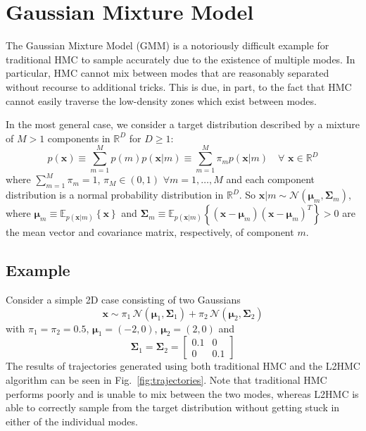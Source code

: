\documentclass[../main.tex]{subfiles}
\begin{document}
\section{Gaussian Mixture Model}%
\label{sec:l2hmc_gmm}
%
The Gaussian Mixture Model (GMM) is a notoriously difficult example for traditional HMC to sample accurately due to the
existence of multiple modes.
%
In particular, HMC cannot mix between modes that are reasonably separated without recourse to additional tricks.
%
This is due, in part, to the fact that HMC cannot easily traverse the low-density zones which exist between modes.

In the most general case, we consider a target distribution described by a mixture of $M > 1$ components in
$\mathbb{R}^{D}$ for $D \geq 1$:
%
\begin{equation}
    p(\mathbf{x}) \equiv \sum_{m=1}^{M} p(m) p(\mathbf{x}|m) \equiv
        \sum_{m=1}^{M} \pi_m p(\mathbf{x}|m) \quad \forall \,\,\mathbf{x} \in
        \mathbb{R}^{D}
    \label{eq:gmm_model}
\end{equation}
%
where $\sum_{m=1}^{M} \pi_m = 1$, $\pi_M \in (0, 1)$ $\forall m = 1, \ldots, M$ and each component distribution is a
normal probability distribution in $\mathbb{R}^{D}$.
%
So $\mathbf{x}|m \sim \mathcal{N}(\bm{\mu}_m, \bm{\Sigma}_m)$, where $\bm{\mu}_m \equiv
\mathbb{E}_{p{(\mathbf{x}|m)}}\left\{\mathbf{x}\right\}$ and $\mathbf{\Sigma}_m \equiv
\mathbb{E}_{p{(\mathbf{x}|m)}}{\left\{{(\mathbf{x} - \bm{\mu}_m)}{(\mathbf{x} - \bm{\mu}_m)}^{T}\right\}} > 0$ are the
mean vector and covariance matrix, respectively, of component $m$.
%
\subsection{Example}
%
Consider a simple 2D case consisting of two Gaussians 
%
\begin{equation}
    \mathbf{x} \sim \pi_1 \,\mathcal{N}(\bm{\mu}_1, \bm{\Sigma}_1) +
        \pi_2\, \mathcal{N}(\bm{\mu}_2, \bm{\Sigma}_2)
    \label{eq:log_likelihood_example}
\end{equation}
%
with $\pi_1 = \pi_2 = 0.5$, $\bm{\mu}_1 = (-2, 0)$, $\bm{\mu}_2 = (2, 0)$ and
%
\begin{equation}
    \bm{\Sigma}_1 = \bm{\Sigma}_2 = 
        \begin{bmatrix}
            0.1    & 0 \\
            0       & 0.1 
        \end{bmatrix}
    \label{eq:covariance_matrix}
\end{equation}
%
The results of trajectories generated using both traditional HMC and the L2HMC algorithm can be seen in
Fig.~\ref{fig:trajectories}.
%
Note that traditional HMC performs poorly and is unable to mix between the two modes, whereas L2HMC is able to
correctly sample from the target distribution without getting stuck in either of the individual modes.
\end{document}
